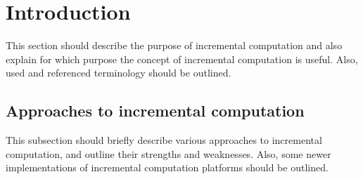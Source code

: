 \section{Introduction}
This section should describe the purpose of incremental computation and also explain for which purpose the concept of incremental computation is useful. Also, used and referenced terminology should be outlined.  

\subsection{Approaches to incremental computation}
This subsection should briefly describe various approaches to incremental computation, and outline their strengths and weaknesses. Also, some newer implementations of incremental computation platforms should be outlined. \cite{heydon2000caching} \cite{acar2004dynamizing} \cite{acar2006adaptive} \cite{cohen1991dynamic} \cite{liu1995systematic} \cite{naiadIncremental} \cite{Chen2014} \cite{Pugh1989} 
\cite{naiadIncremental} \cite{Hammer2009} \cite{ley2008compiling} \cite{Peng2010} \cite{Acar2008}
